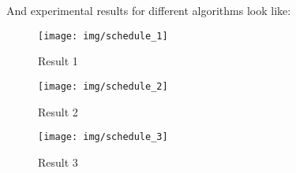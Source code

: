 \documentclass{article}
\begin{document}
\begin{center}
\end{center}

And experimental results for different algorithms look like:

\begin{figure}[h]
    \centering
    
    \texttt{[image: img/schedule\_1]}
    \caption{Result 1}
    \label{}
\end{figure}

\begin{figure}[h]
    \centering

    \texttt{[image: img/schedule\_2]}
    \caption{Result 2}
    \label{}
\end{figure}

\begin{figure}[h]
    \centering

    \texttt{[image: img/schedule\_3]}
    \caption{Result 3}
    \label{}
\end{figure}
\end{document}
